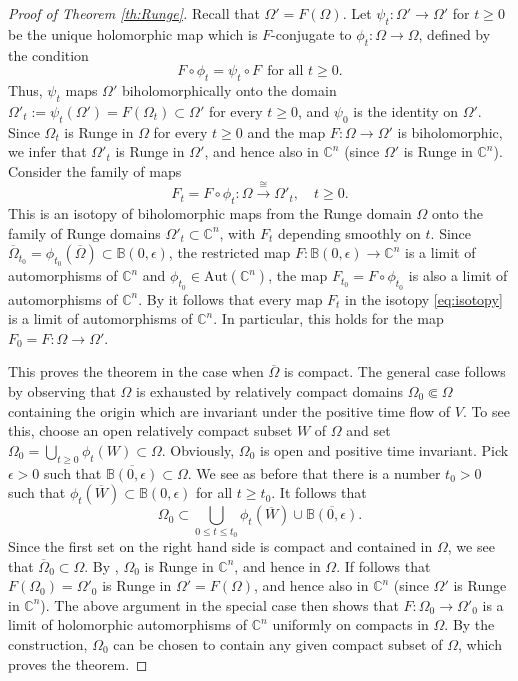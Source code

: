 \documentclass[12pt]{amsart}
\theoremstyle{definition}
\numberwithin{equation}{section}
\numberwithin{figure}{section}
\newcommand\B{\mathbb{B}}
\newcommand\C{\mathbb{C}}
\newcommand\Aut{\mathrm{Aut}}
\numberwithin{equation}{section}
\begin{document}
\begin{proof}[Proof of Theorem \ref{th:Runge}]
Recall that $\Omega'=F(\Omega)$. 
Let $\psi_t:\Omega'\to \Omega'$ for $t\ge 0$ be the unique 
holomorphic map which is $F$-conjugate to $\phi_t:\Omega\to\Omega$,
defined by the condition
\[
	F\circ \phi_t = \psi_t \circ F\ \ \text{for all $t\ge 0$}.
\]
Thus, $\psi_t$ maps $\Omega'$ biholomorphically onto the domain
$
	\Omega'_t:=\psi_t(\Omega') =F(\Omega_t)\subset\Omega'
$
for every $t\ge 0$, and $\psi_0$ is the identity on $\Omega'$. 
Since $\Omega_t$ is Runge in $\Omega$ for every $t\ge 0$ 
and the map $F:\Omega\to\Omega'$ is biholomorphic, we infer
that $\Omega'_t$ is Runge in $\Omega'$, 
and hence also in $\C^n$ (since $\Omega'$ is Runge in $\C^n$). 
Consider the family of maps 
\begin{equation}\label{eq:isotopy}
	F_t = F\circ \phi_t : 
	\Omega \stackrel{\cong}{\longrightarrow} \Omega'_t,
	\quad t\ge 0.
\end{equation}
This is an isotopy of biholomorphic maps from the Runge domain $\Omega$
onto the family of Runge domains $\Omega'_t\subset \C^n$, 
with $F_t$ depending smoothly on $t$. Since 
$\overline \Omega_{t_0}= \phi_{t_0}(\overline \Omega)\subset \B(0,\epsilon)$, 
the restricted map $F:\B(0,\epsilon)\to \C^n$ is a limit of 
automorphisms of $\C^n$ and $\phi_{t_0}\in\Aut(\C^n)$,
the map $F_{t_0}=F\circ\phi_{t_0}$ is 
also a limit of automorphisms of $\C^n$. By 
\cite[Theorem 1.1]{ForstnericRosay1993} 
it follows that every map $F_t$ in the isotopy \eqref{eq:isotopy}
is a limit of automorphisms of $\C^n$. In particular, this holds for
the map $F_0=F:\Omega\to\Omega'$.

This proves the theorem in the case when $\overline\Omega$
is compact. The general case follows by observing that 
$\Omega$ is exhausted by relatively compact 
domains $\Omega_0\Subset \Omega$ containing the origin
which are invariant under the positive time flow of $V$. 
To see this, choose an open relatively compact subset $W$ of $\Omega$ 
and set $\Omega_0=\bigcup_{t\ge 0} \phi_t(W)\subset \Omega$.
Obviously, $\Omega_0$ is open and positive time invariant.
Pick $\epsilon>0$ such that $\overline{\B(0,\epsilon)}\subset\Omega$.
We see as before that there is a number $t_0>0$ 
such that $\phi_t(\overline W)\subset \B(0,\epsilon)$ for all $t\ge t_0$.
It follows that 
\[
	\Omega_0 \subset 
	\bigcup_{0\le t\le t_0}\phi_t(\overline W) \cup 
	\overline{\B(0,\epsilon)}.
\]
Since the first set on the right hand side is compact
and contained in $\Omega$, we see that 
$\overline \Omega_0\subset\Omega$.
By \cite[Theorem 1.1]{ChatterjeeGorai2025X}, 
$\Omega_0$ is Runge in $\C^n$, and hence in $\Omega$.
If follows that $F(\Omega_0)=\Omega'_0$ is Runge 
in $\Omega'=F(\Omega)$, and hence also in $\C^n$ 
(since $\Omega'$ is Runge in $\C^n$). The above argument 
in the special case then shows that $F:\Omega_0\to  \Omega'_0$ 
is a limit of holomorphic automorphisms of $\C^n$ uniformly on
compacts in $\Omega$. 
By the construction, $\Omega_0$ can be chosen to contain 
any given compact subset of $\Omega$, which proves the theorem.
\end{proof}
\end{document}
